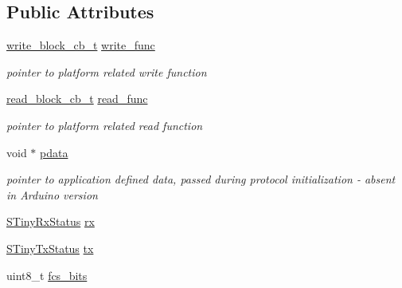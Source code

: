 \subsection*{Public Attributes}
\begin{DoxyCompactItemize}
\item 
\hypertarget{structSTinyData_a26c40b0b7e18776af99745624c460c5a}{}\hyperlink{tiny__layer2_8h_a7f69e669de5baa69a43ee5cb439a7496}{write\+\_\+block\+\_\+cb\+\_\+t} \hyperlink{structSTinyData_a26c40b0b7e18776af99745624c460c5a}{write\+\_\+func}\label{structSTinyData_a26c40b0b7e18776af99745624c460c5a}

\begin{DoxyCompactList}\small\item\em pointer to platform related write function \end{DoxyCompactList}\item 
\hypertarget{structSTinyData_a9714041284fd99230be0e7efbc8c60cf}{}\hyperlink{tiny__layer2_8h_ae3d867e030f59de94508902f2b84a7ec}{read\+\_\+block\+\_\+cb\+\_\+t} \hyperlink{structSTinyData_a9714041284fd99230be0e7efbc8c60cf}{read\+\_\+func}\label{structSTinyData_a9714041284fd99230be0e7efbc8c60cf}

\begin{DoxyCompactList}\small\item\em pointer to platform related read function \end{DoxyCompactList}\item 
\hypertarget{structSTinyData_a3ac48d44af9b2912dd980c7377a020be}{}void $\ast$ \hyperlink{structSTinyData_a3ac48d44af9b2912dd980c7377a020be}{pdata}\label{structSTinyData_a3ac48d44af9b2912dd980c7377a020be}

\begin{DoxyCompactList}\small\item\em pointer to application defined data, passed during protocol initialization -\/ absent in Arduino version \end{DoxyCompactList}\item 
\hyperlink{structSTinyRxStatus}{S\+Tiny\+Rx\+Status} \hyperlink{structSTinyData_aa3b43db99a1a6bf3d562f932d5a539db}{rx}
\item 
\hyperlink{structSTinyTxStatus}{S\+Tiny\+Tx\+Status} \hyperlink{structSTinyData_aa099adb35f3494332747eb18851fbb23}{tx}
\item 
\hypertarget{structSTinyData_a3cf4d6009cc472630e20a68d6fa50186}{}uint8\+\_\+t \hyperlink{structSTinyData_a3cf4d6009cc472630e20a68d6fa50186}{fcs\+\_\+bits}\label{structSTinyData_a3cf4d6009cc472630e20a68d6fa50186}


\end{DoxyCompactItemize}
